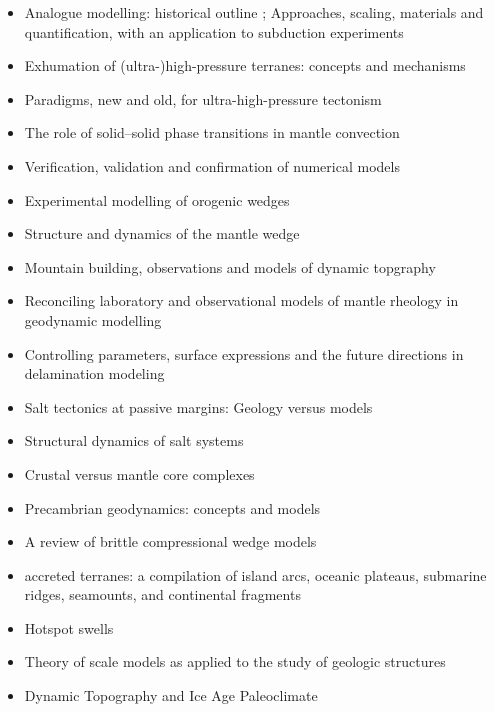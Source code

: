 \begin{itemize}
\item Analogue modelling: historical outline \cite{koyi97}; Approaches, scaling, materials and quantification, with an application to subduction experiments \cite{scst16}
\item Exhumation of (ultra-)high-pressure terranes: concepts and mechanisms \cite{warr13}
\item Paradigms, new and old, for ultra-high-pressure tectonism \cite{hage13}
\item The role of solid–solid phase transitions in mantle convection \cite{fada17}
\item Verification, validation and confirmation of numerical models \cite{orsb94}
\item Experimental modelling of orogenic wedges \cite{grmd12}
\item Structure and dynamics of the mantle wedge \cite{vank03}
\item Mountain building, observations and models of dynamic topgraphy \cite{flgm13,fabc13}
\item Reconciling laboratory and observational models of mantle rheology in geodynamic modelling \cite{king16}
\item Controlling parameters, surface expressions and the future directions in delamination modeling \cite{goue18}
\item Salt tectonics at passive margins: Geology versus models \cite{brfo11}
\item Structural dynamics of salt systems \cite{javs94}
\item Crustal versus mantle core complexes \cite{brst18}
\item Precambrian geodynamics: concepts and models \cite{gery14}
\item A review of brittle compressional wedge models \cite{buit12}
\item accreted terranes: a compilation of island arcs, oceanic
      plateaus, submarine ridges, seamounts, and continental fragments \cite{tebu14}
\item Hotspot swells \cite{kiad14}
\item Theory of scale models as applied to the study of geologic structures \cite{hubb37}
\item Dynamic Topography and Ice Age Paleoclimate \cite{miac20}
\end{itemize}

